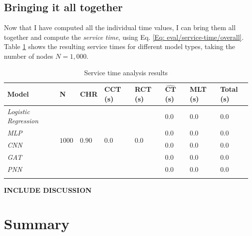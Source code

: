 			\subsection{Bringing it all together} \label{Section: eval/service-time/together}
			Now that I have computed all the individual time values, I can bring them all together and compute the \textit{service time}, using Eq. \ref{Eq: eval/service-time/overall}. Table \ref{Table: eval/service-time/together/overall} shows the resulting service times for different model types, taking the number of nodes $N=1,000$.
			\begin{longtable}{|p{}||p{.1\textwidth}|p{}|p{}|p{}|p{}|p{}||p{}|}
				\textbf{Model} & \textbf{N} & \textbf{CHR} & \textbf{CCT} (s)  & \textbf{RCT} (s)& $\mathbf{\hat{CT}}$ (s)& \textbf{MLT} (s)& \textbf{Total} (s)\\
				\hline
				\textit{Logistic Regression} & \multirow{5}{*}{$1000$} & \multirow{5}{*}{$0.90$} & \multirow{5}{*}{$0.0$} & \multirow{5}{*}{$0.0$} & $0.0$ & $0.0$ & \cellcolor{green!20} $\mathbf{0.0}$ \\
				\hhline{-~~~~---}
				\textit{MLP} &  &  &  &  & $0.0$ & $0.0$ &\cellcolor{green!20} $\mathbf{0.0}$  \\
				\hhline{-~~~~---}
				\textit{CNN} &  &  &  &  & $0.0$ & $0.0$ & \cellcolor{green!20} $\mathbf{0.0}$ \\
				\hhline{-~~~~---}
				\textit{GAT} &  &  &  & & $0.0$ & $0.0$ & \cellcolor{green!20} $\mathbf{0.0}$ \\
				\hhline{-~~~~---}
				\textit{PNN} &  &  &  &  & $0.0$ & $0.0$ & \cellcolor{green!20} $\mathbf{0.0}$ \\
				\hline
				\caption{Service time analysis results}
				\label{Table: eval/service-time/together/overall}
			\end{longtable}
			{\LARGE \textbf{INCLUDE DISCUSSION}}
		\section{Summary} \label{Section: eval/summary}
